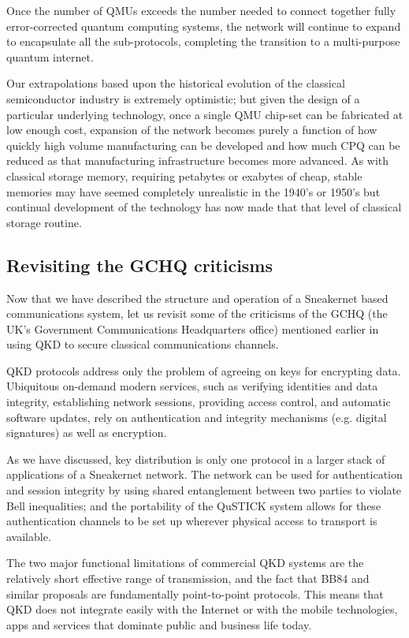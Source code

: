 \documentclass[twocolumn, aps, rmp, amsmath, amssymb, nofootinbib, superscriptaddress, longbibliography, floatfix, table-of-contents, eqsecnum]{revtex4-2}
\begin{document}
Once the number of QMUs exceeds the number needed to connect together fully error-corrected quantum computing systems, the network will continue to expand to encapsulate all the sub-protocols, completing the transition to a multi-purpose quantum internet. 

Our extrapolations based upon the historical evolution of the classical semiconductor industry is extremely optimistic; but given the design of a particular underlying technology, once a single QMU chip-set can be fabricated at low enough cost, expansion of the network becomes purely a function of how quickly high volume manufacturing can be developed and how much CPQ can be reduced as that manufacturing infrastructure becomes more advanced. As with classical storage memory, requiring petabytes or exabytes of cheap, stable memories may have seemed completely unrealistic in the 1940's or 1950's but continual development of the technology has now made that that level of classical storage routine.

\subsection{Revisiting the GCHQ criticisms}

Now that we have described the structure and operation of a Sneakernet based communications system, let us revisit some of the criticisms of the GCHQ (the UK's Government Communications Headquarters office) mentioned earlier in using QKD to secure classical communications channels. 

QKD protocols address only the problem of agreeing on keys for encrypting data. Ubiquitous on-demand modern services, such as verifying identities and data integrity, establishing network sessions, providing access control, and automatic software updates, rely on authentication and integrity mechanisms (e.g. digital signatures) as well as encryption.

As we have discussed, key distribution is only one protocol in a larger stack of applications of a Sneakernet network. The network can be used for authentication and session integrity by using shared entanglement between two parties to violate Bell inequalities; and the portability of the QuSTICK system allows for these authentication channels to be set up wherever physical access to transport is available.

The two major functional limitations of commercial QKD systems are the relatively short effective range of transmission, and the fact that BB84 and similar proposals are fundamentally point-to-point protocols. This means that QKD does not integrate easily with the Internet or with the mobile technologies, apps and services that dominate public and business life today.
\end{document}
